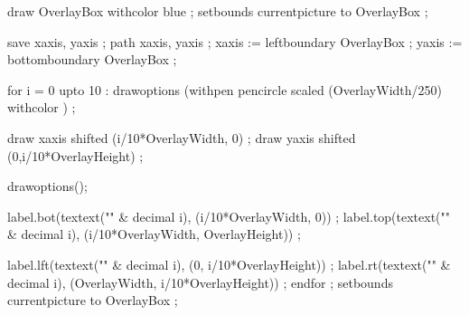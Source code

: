 
\ifconditional \simpleslidesHighlight
  \ifconditional \simpleslidesGrid
  \fi
  \ifconditional \simpleslidesSubGrid
  \fi
 \ifcase \simpleslidesHighlightAlternative \or
   \or
   \or
   draw OverlayBox withcolor blue ; \fi
  \fi
  setbounds currentpicture to OverlayBox ;
\stopuseMPgraphic


  save xaxis, yaxis ; path xaxis, yaxis ;
  xaxis := leftboundary OverlayBox ;
  yaxis := bottomboundary OverlayBox ;


  for i = 0 upto 10 :
    drawoptions (withpen pencircle scaled (OverlayWidth/250) 
                 withcolor \MPcolor\simpleslidesGridColor) ;

    draw xaxis shifted (i/10*OverlayWidth, 0) ;
    draw yaxis shifted (0,i/10*OverlayHeight) ;

    drawoptions(); %

    label.bot(textext("\ix {}" & decimal i),
              (i/10*OverlayWidth, 0)) ;
    label.top(textext("\ix {}" & decimal i),
              (i/10*OverlayWidth, OverlayHeight)) ;

    label.lft(textext("\ix {}" & decimal i),
              (0, i/10*OverlayHeight)) ;
    label.rt(textext("\ix {}" & decimal i),
              (OverlayWidth, i/10*OverlayHeight)) ;
  endfor ;
  setbounds currentpicture to OverlayBox ;
\stopuseMPgraphic


